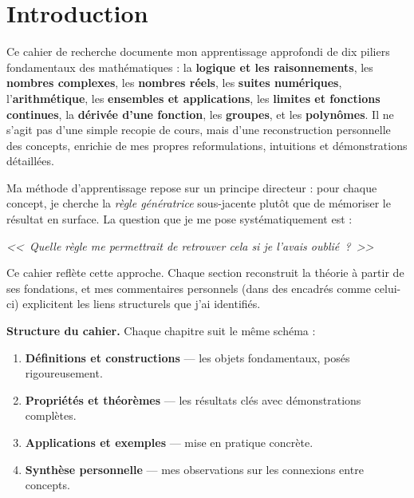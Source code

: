 \chapter*{Introduction}

Ce cahier de recherche documente mon apprentissage approfondi de dix piliers fondamentaux des mathématiques : la \textbf{logique et les raisonnements}, les \textbf{nombres complexes}, les \textbf{nombres réels}, les \textbf{suites numériques}, l'\textbf{arithmétique}, les \textbf{ensembles et applications}, les \textbf{limites et fonctions continues}, la \textbf{dérivée d'une fonction}, les \textbf{groupes}, et les \textbf{polynômes}. Il ne s'agit pas d'une simple recopie de cours, mais d'une reconstruction personnelle des concepts, enrichie de mes propres reformulations, intuitions et démonstrations détaillées.

\begin{intuitionbox}[Démarche]
Ma méthode d'apprentissage repose sur un principe directeur : pour chaque concept, je cherche la \emph{règle génératrice} sous-jacente plutôt que de mémoriser le résultat en surface. La question que je me pose systématiquement est :

\medskip
\centerline{\textit{<<~Quelle règle me permettrait de retrouver cela si je l'avais oublié~?~>>}}
\medskip

Ce cahier reflète cette approche. Chaque section reconstruit la théorie à partir de ses fondations, et mes commentaires personnels (dans des encadrés comme celui-ci) explicitent les liens structurels que j'ai identifiés.
\end{intuitionbox}

\textbf{Structure du cahier.} Chaque chapitre suit le même schéma :
\begin{enumerate}[leftmargin=2cm]
  \item \textbf{Définitions et constructions} --- les objets fondamentaux, posés rigoureusement.
  \item \textbf{Propriétés et théorèmes} --- les résultats clés avec démonstrations complètes.
  \item \textbf{Applications et exemples} --- mise en pratique concrète.
  \item \textbf{Synthèse personnelle} --- mes observations sur les connexions entre concepts.
\end{enumerate}
